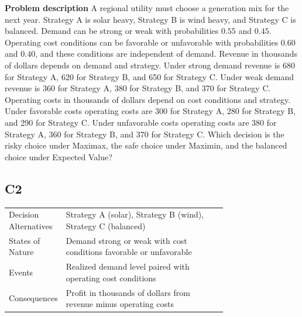\begin{ExamProblems}
		\item
		\textbf{Problem description}
		A regional utility must choose a generation mix for the next year. Strategy A is solar heavy, Strategy B is wind heavy, and Strategy C is balanced. Demand can be strong or weak with probabilities $0.55$ and $0.45$. Operating cost conditions can be favorable or unfavorable with probabilities $0.60$ and $0.40$, and these conditions are independent of demand. Revenue in thousands of dollars depends on demand and strategy. Under strong demand revenue is 680 for Strategy A, 620 for Strategy B, and 650 for Strategy C. Under weak demand revenue is 360 for Strategy A, 380 for Strategy B, and 370 for Strategy C. Operating costs in thousands of dollars depend on cost conditions and strategy. Under favorable costs operating costs are 300 for Strategy A, 280 for Strategy B, and 290 for Strategy C. Under unfavorable costs operating costs are 380 for Strategy A, 360 for Strategy B, and 370 for Strategy C. Which decision is the risky choice under Maximax, the safe choice under Maximin, and the balanced choice under Expected Value?

		\subsection*{C2}
		\begin{center}
			\begin{tabular}{l p{0.74\linewidth}}
				\toprule
				Decision Alternatives & Strategy A (solar), Strategy B (wind), Strategy C (balanced) \\
				States of Nature & Demand strong or weak with cost conditions favorable or unfavorable \\
				Events & Realized demand level paired with operating cost conditions \\
				Consequences & Profit in thousands of dollars from revenue minus operating costs \\
				\bottomrule
			\end{tabular}
		\end{center}


\end{ExamProblems}
